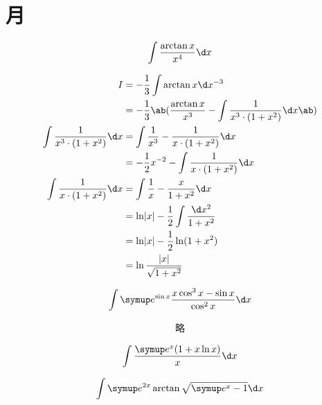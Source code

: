 \section{月}

\begin{question}
    \begin{equation*}
        \int\frac{\arctan x}{x^4} \d x
    \end{equation*}
\end{question}
\begin{solution}
    \begin{align*}
        I &= -\frac 1 3 \int \arctan x \d x^{-3}    \\
        &= -\frac 1 3 \ab( \frac{\arctan x}{x^3} - \int \frac{1}{x^3 \cdot (1 + x^2)} \d x \ab)  \\
        \int \frac{1}{x^3 \cdot (1 + x^2)} \d x &=\int \frac{1}{x^3} - \frac{1}{x \cdot (1 + x^2)} \d x \\
        &= -\frac 1 2 x^{-2} - \int \frac{1}{x \cdot (1 + x^2)} \d x    \\
        \int \frac{1}{x \cdot (1 + x^2)} \d x &= \int \frac 1 x - \frac{x}{1 + x^2} \d x    \\
        &= \ln\abs{x} - \frac 1 2 \int \frac{\d x^2}{1 + x^2}   \\
        &= \ln\abs{x} - \frac 1 2 \ln(1 + x^2)  \\
        &= \ln\frac{\abs{x}}{\sqrt{1 + x^2}}
    \end{align*}
\end{solution}

\begin{question}
    \begin{equation*}
        \int \me^{ \sin x } \frac{ x \cos^3 x - \sin x }{ \cos^2 x } \d x
    \end{equation*}
\end{question}
\begin{solution}
    \begin{align*}
        略
    \end{align*}
\end{solution}

\begin{question}
    \begin{equation*}
        \int \frac{ \me^x ( 1 + x \ln x ) }{ x } \d x
    \end{equation*}
\end{question}

\begin{question}
    \begin{equation*}
        \int \me^{2x} \arctan \sqrt{ \me^x - 1 } \d x
    \end{equation*}
\end{question}

